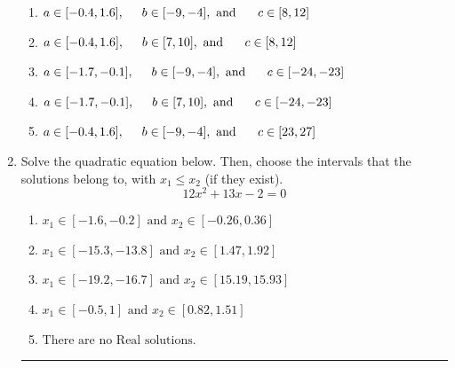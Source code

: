 \documentclass[14pt]{extbook}
\newcommand{\litem}[1]{\item#1\hspace*{-1cm}\rule{\textwidth}{0.4pt}}
\begin{document}
\begin{enumerate}
{\begin{center}
\end{center}
\begin{enumerate}[label=\Alph*.]
\item \( a \in [-0.4, 1.6], \hspace*{5mm} b \in [-9, -4], \text{ and } \hspace*{5mm} c \in [8, 12] \)
\item \( a \in [-0.4, 1.6], \hspace*{5mm} b \in [7, 10], \text{ and } \hspace*{5mm} c \in [8, 12] \)
\item \( a \in [-1.7, -0.1], \hspace*{5mm} b \in [-9, -4], \text{ and } \hspace*{5mm} c \in [-24, -23] \)
\item \( a \in [-1.7, -0.1], \hspace*{5mm} b \in [7, 10], \text{ and } \hspace*{5mm} c \in [-24, -23] \)
\item \( a \in [-0.4, 1.6], \hspace*{5mm} b \in [-9, -4], \text{ and } \hspace*{5mm} c \in [23, 27] \)

\end{enumerate} }
\litem{
Solve the quadratic equation below. Then, choose the intervals that the solutions belong to, with $x_1 \leq x_2$ (if they exist).\[ 12x^{2} +13 x -2 = 0 \]\begin{enumerate}[label=\Alph*.]
\item \( x_1 \in [-1.6, -0.2] \text{ and } x_2 \in [-0.26, 0.36] \)
\item \( x_1 \in [-15.3, -13.8] \text{ and } x_2 \in [1.47, 1.92] \)
\item \( x_1 \in [-19.2, -16.7] \text{ and } x_2 \in [15.19, 15.93] \)
\item \( x_1 \in [-0.5, 1] \text{ and } x_2 \in [0.82, 1.51] \)
\item \( \text{There are no Real solutions.} \)


\end{enumerate}}
\end{enumerate}
\end{document}
